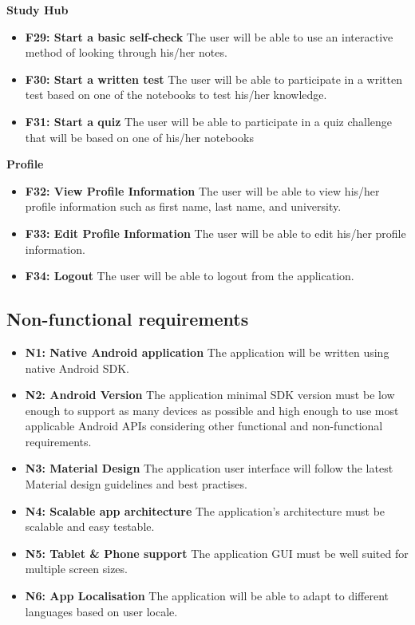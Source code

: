 \documentclass[thesis=B,english]{FITthesis}[2012/10/20]
\begin{document}
\bigskip
\textbf{Study Hub}
\begin{itemize}
	\item \textbf{F29: Start a basic self-check} The user will be able to use an interactive method of looking through his/her notes.
	\item \textbf{F30: Start a written test} The user will be able to participate in a written test based on one of the notebooks to test his/her knowledge.
	\item \textbf{F31: Start a quiz} The user will be able to participate in a quiz challenge that will be based on one of his/her notebooks
	
\end{itemize}


\bigskip
\textbf{Profile}
\begin{itemize}
	\item \textbf{F32: View Profile Information} The user will be able to view his/her profile information such as first name, last name, and  university.
	\item \textbf{F33: Edit Profile Information} The user will be able to edit his/her profile information.
	\item \textbf{F34: Logout} The user will be able to logout from the application.
\end{itemize}


\subsection{Non-functional requirements}

\begin{itemize}
  \item \textbf{N1: Native Android application}  The application will be written using native Android SDK.
  \item \textbf{N2: Android Version} The application minimal SDK version must be low enough to support as many devices as possible and high enough to use most applicable  Android APIs considering other functional and non-functional requirements.
  \item \textbf{N3: Material Design} The application user interface will follow the latest Material design guidelines and best practises.
  \item \textbf{N4: Scalable app architecture} The application's architecture must be scalable and easy testable.
  \item \textbf{N5: Tablet \& Phone support} The application GUI must be well suited for multiple screen sizes.
  \item \textbf{N6: App Localisation} The application will be able to adapt to different languages based on user locale.
\end{itemize}
\end{document}
